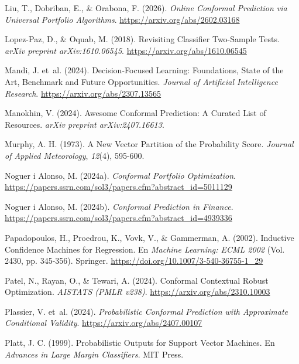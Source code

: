 \documentclass[
  spanish,
  11pt,
  letterpaper,
]{scrbook}
\newlength{\cslhangindent}
\newenvironment{CSLReferences}[2] %
 {\begin{list}{}{%
  \setlength{\itemindent}{0pt}
  \setlength{\leftmargin}{0pt}
  \setlength{\parsep}{0pt}
  \ifodd #1
   \setlength{\leftmargin}{\cslhangindent}
   \setlength{\itemindent}{-1\cslhangindent}
  \fi
  \setlength{\itemsep}{#2\baselineskip}}}
 {\end{list}}
\theoremstyle{plain}
\theoremstyle{remark}
\begin{document}
\begin{CSLReferences}{1}{0}
Liu, T., Dobriban, E., \& Orabona, F. (2026). \emph{Online Conformal
Prediction via Universal Portfolio Algorithms}.
\url{https://arxiv.org/abs/2602.03168}

Lopez-Paz, D., \& Oquab, M. (2018). Revisiting Classifier Two-Sample
Tests. \emph{arXiv preprint arXiv:1610.06545}.
\url{https://arxiv.org/abs/1610.06545}

{Mandi, J. et~al.} (2024). Decision-Focused Learning: Foundations, State
of the Art, Benchmark and Future Opportunities. \emph{Journal of
Artificial Intelligence Research}.
\url{https://arxiv.org/abs/2307.13565}

Manokhin, V. (2024). Awesome Conformal Prediction: A Curated List of
Resources. \emph{arXiv preprint arXiv:2407.16613}.

Murphy, A. H. (1973). A New Vector Partition of the Probability Score.
\emph{Journal of Applied Meteorology}, \emph{12}(4), 595-600.

Noguer i Alonso, M. (2024a). \emph{Conformal Portfolio Optimization}.
\url{https://papers.ssrn.com/sol3/papers.cfm?abstract_id=5011129}

Noguer i Alonso, M. (2024b). \emph{Conformal Prediction in Finance}.
\url{https://papers.ssrn.com/sol3/papers.cfm?abstract_id=4939336}

Papadopoulos, H., Proedrou, K., Vovk, V., \& Gammerman, A. (2002).
Inductive Confidence Machines for Regression. En \emph{Machine Learning:
ECML 2002} (Vol. 2430, pp. 345-356). Springer.
\url{https://doi.org/10.1007/3-540-36755-1_29}

Patel, N., Rayan, O., \& Tewari, A. (2024). Conformal Contextual Robust
Optimization. \emph{AISTATS (PMLR v238)}.
\url{https://arxiv.org/abs/2310.10003}

{Plassier, V. et~al.} (2024). \emph{Probabilistic Conformal Prediction
with Approximate Conditional Validity}.
\url{https://arxiv.org/abs/2407.00107}

Platt, J. C. (1999). Probabilistic Outputs for Support Vector Machines.
En \emph{Advances in Large Margin Classifiers}. MIT Press.


\end{CSLReferences}
\end{document}
